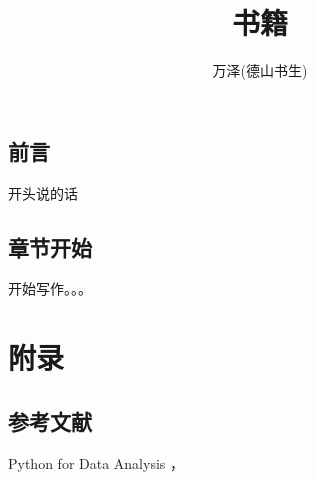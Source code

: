 \documentclass[11pt,oneside]{book}
\begin{document}
\frontmatter

\title{书籍}
\author{万泽(德山书生)}
\maketitle

\chapter*{前言}
开头说的话



\setcounter{tocdepth}{2}
\tableofcontents

\mainmatter

\chapter{章节开始}

开始写作。。。




\appendix
\part{附录}

\backmatter
\chapter*{参考文献}
\begin{thebibliography}{9}
 Python for Data Analysis ，
\end{thebibliography}
\end{document}
